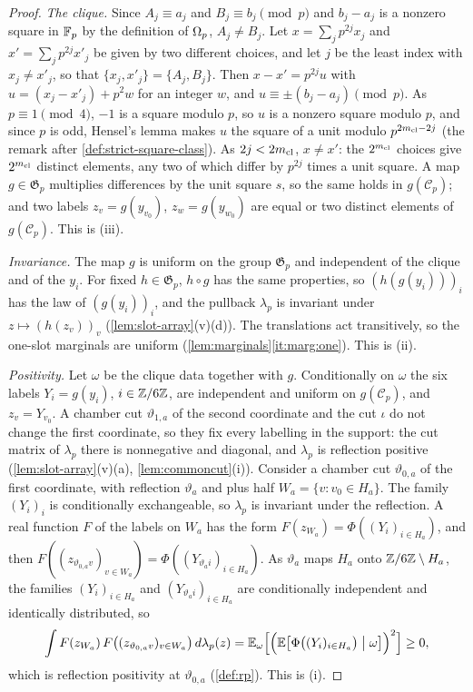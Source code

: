 \begin{proof}
\emph{The clique.} Since $A_j\equiv a_j$ and $B_j\equiv b_j\pmod p$ and
$b_j-a_j$ is a nonzero square in $\mathbb F_p$ by the definition of $\Omega_{p}$, $A_j\ne B_j$. Let $x=\sum_jp^{2j}x_j$ and $x'=\sum_jp^{2j}x'_j$
be given by two different choices, and let $j$ be the least index with
$x_j\ne x'_j$, so that $\{x_j,x'_j\}=\{A_j,B_j\}$. Then $x-x'=p^{2j}u$ with
$u=(x_j-x'_j)+p^2w$ for an integer $w$, and $u\equiv\pm(b_j-a_j)\pmod p$. As
$p\equiv1\pmod4$, $-1$ is a square modulo $p$, so $u$ is a nonzero square
modulo $p$, and since $p$ is odd, Hensel's lemma makes $u$ the square of a unit
modulo $p^{2m_{\mathrm{cl}}-2j}$ (the remark after \cref{def:strict-square-class}). As
$2j<2m_{\mathrm{cl}}$, $x\ne x'$: the $2^{m_{\mathrm{cl}}}$ choices give $2^{m_{\mathrm{cl}}}$ distinct elements,
any two of which differ by $p^{2j}$ times a unit square. A map
$g\in\mathfrak G_p$ multiplies differences by the unit square $s$, so the same
holds in $g(\mathcal C_p)$; and two labels $z_v=g(y_{v_0})$, $z_w=g(y_{w_0})$
are equal or two distinct elements of $g(\mathcal C_p)$. This is (iii).

\emph{Invariance.} The map $g$ is uniform on the group $\mathfrak G_p$ and
independent of the clique and of the $y_i$. For fixed $h\in\mathfrak G_p$,
$h\circ g$ has the same properties, so $(h(g(y_i)))_i$ has the law of
$(g(y_i))_i$, and the pullback $\lambda_p$ is invariant under
$z\mapsto(h(z_v))_v$ (\cref{lem:slot-array}(v)(d)). The translations act
transitively, so the one-slot marginals are uniform
(\cref{lem:marginals}\ref{it:marg:one}). This is (ii).

\emph{Positivity.} Let $\omega$ be the clique data together with $g$.
Conditionally on $\omega$ the six labels $Y_i=g(y_i)$, $i\in\mathbb Z/6\mathbb Z$, are
independent and uniform on $g(\mathcal C_p)$, and $z_v=Y_{v_0}$. A chamber cut
$\vartheta_{1,a}$ of the second coordinate and the cut $\iota$ do not change the
first coordinate, so they fix every labelling in the support: the cut matrix of
$\lambda_p$ there is nonnegative and diagonal, and $\lambda_p$ is reflection
positive (\cref{lem:slot-array}(v)(a), \cref{lem:commoncut}(i)). Consider a
chamber cut $\vartheta_{0,a}$ of the first coordinate, with reflection
$\vartheta_a$ and plus half $W_a=\{v:v_0\in H_a\}$. The family $(Y_i)_i$ is
conditionally exchangeable, so $\lambda_p$ is invariant under the reflection. A
real function $F$ of the labels on $W_a$ has the form
$F(z_{W_a})=\Phi((Y_i)_{i\in H_a})$, and then
$F((z_{\vartheta_{0,a}v})_{v\in W_a})=\Phi((Y_{\vartheta_ai})_{i\in H_a})$. As
$\vartheta_a$ maps $H_a$ onto $\mathbb Z/6\mathbb Z\setminus H_a$, the families
$(Y_i)_{i\in H_a}$ and $(Y_{\vartheta_ai})_{i\in H_a}$ are conditionally
independent and identically distributed, so
\[
 \int F(z_{W_a})\,F\bigl((z_{\vartheta_{0,a}v})_{v\in W_a}\bigr)\,d\lambda_p(z)
 =\mathbb E_\omega\Bigl[\Bigl(\mathbb E\bigl[\Phi\bigl((Y_i)_{i\in H_a}\bigr)\bigm|\omega\bigr]\Bigr)^2\Bigr]\ge0 ,
\]
which is reflection positivity at $\vartheta_{0,a}$ (\cref{def:rp}). This is (i).


\end{proof}
